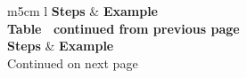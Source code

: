 \documentclass[11pt,a4paper]{report}
\begin{document}
        \begin{flushleft}
                \begin{center}
                    \begin{longtable}{ m{5cm} l }
                        \textbf{Steps} & \textbf{Example} \\
                        \hline
                        \endfirsthead
                        {{\bfseries Table \thetable\ continued from previous page}} \\
                        \textbf{Steps} & \textbf{Example} \\
                        \hline
                        \endhead
                        \hline Continued on next page \\
                        \endfoot
                        \endlastfoot


\end{longtable}
\end{center}
\end{flushleft}
\end{document}
